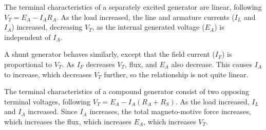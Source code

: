 \documentclass{article}
\begin{document}
The terminal characteristics of a separately excited generator are linear,
following $V_T = E_A - {I_A}{R_A}$.  As the load increased, the line and
armature currents ($I_L$ and $I_A$) increased, decreasing $V_T$, as the internal
generated voltage ($E_A$) is independent of $I_A$.

A shunt generator behaves similarly, except that the field current ($I_F$) is
proportional to $V_T$.  As $I_F$ decreases $V_T$, flux, and $E_A$ also
decrease. This causes $I_A$ to increase, which decreases $V_T$ further, so the
relationship is not quite linear.

The terminal characteristics of a compound generator consist of two opposing
terminal voltages, following $V_T = E_A - I_A(R_A + R_S)$.  As the load
increased, $I_L$ and $I_A$ increased.  Since $I_A$ increases, the total
magneto-motive force increases, which increases the flux, which increases
$E_A$, which increases $V_T$.
\end{document}
